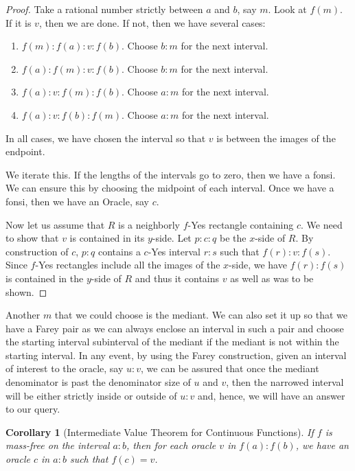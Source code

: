 \documentclass[12pt]{article}
\newtheorem{corollary}{Corollary}
\theoremstyle{remark}
\begin{document}
\begin{proof}
Take a rational number strictly between $a$ and $b$, say $m$. Look at $f(m)$. If it is $v$, then we are done. If not, then we have several cases: 
\begin{enumerate}
\item $f(m):f(a):v:f(b)$. Choose $b:m$ for the next interval.
\item $f(a):f(m):v:f(b)$. Choose $b:m$ for the next interval. 
\item $f(a):v:f(m):f(b)$. Choose $a:m$ for the next interval.
\item $f(a):v:f(b):f(m)$. Choose $a:m$ for the next interval. 
\end{enumerate}
In all cases, we have chosen the interval so that $v$ is between the images of the endpoint. 

We iterate this. If the lengths of the intervals go to zero, then we have a fonsi. We can ensure this by choosing the midpoint of each interval. Once we have a fonsi, then we have an Oracle, say $c$. 

Now let us assume that $R$ is a neighborly $f$-Yes rectangle containing $c$. We need to show that $v$ is contained in its $y$-side. Let $p:c:q$ be the $x$-side of $R$. By construction of $c$, $p:q$ contains a $c$-Yes interval $r:s$ such that $f(r):v:f(s)$. Since $f$-Yes rectangles include all the images of the $x$-side, we have $f(r):f(s)$ is contained in the $y$-side of $R$ and thus it contains $v$ as well as was to be shown. 
\end{proof}

Another $m$ that we could choose is the mediant. We can also set it up so that we have a Farey pair as we can always enclose an interval in such a pair and choose the starting interval subinterval of the mediant if the mediant is not within the starting interval. In any event, by using the Farey construction, given an interval of interest to the oracle, say $u:v$, we can be assured that once the mediant denominator is past the denominator size of $u$ and $v$, then the narrowed interval will be either strictly inside or outside of $u:v$ and, hence, we will have an answer to our query. 

\begin{corollary}[Intermediate Value Theorem for Continuous Functions]
If $f$ is mass-free on the interval $a:b$, then for each oracle $v$ in $f(a):f(b)$, we have an oracle $c$ in $a:b$ such that $f(c)=v$.
\end{corollary}
\end{document}
